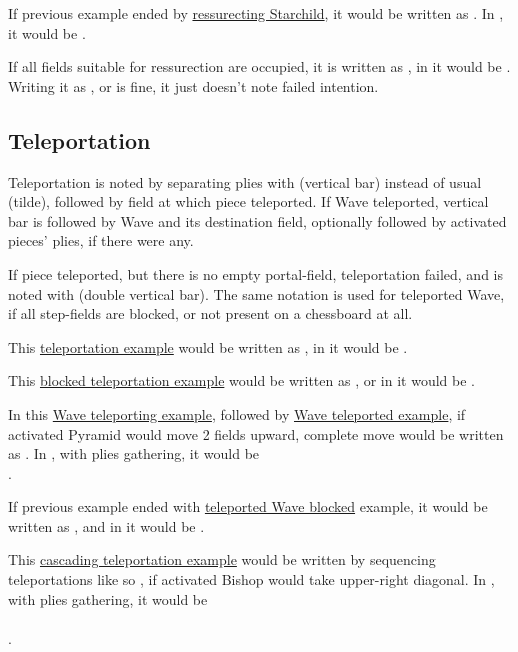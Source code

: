 If previous example ended by \hyperref[fig:scn_o_25_syzygy_starchild_ressurection]{ressurecting Starchild},
it would be written as . In , it would be .

If all fields suitable for ressurection are occupied, it is written as , in  it
would be . Writing it as , or  is fine, it just doesn't note failed
intention.

\subsection*{Teleportation}
\label{sec:Appendix/Teleportation}

Teleportation is noted by separating plies with \alg{|} (vertical bar) instead of usual \alg{\~{}} (tilde),
followed by field at which piece teleported. If Wave teleported, vertical bar is followed by Wave and its
destination field, optionally followed by activated pieces' plies, if there were any.

If piece teleported, but there is no empty portal-field, teleportation failed, and is noted with \alg{||}
(double vertical bar). The same notation is used for teleported Wave, if all step-fields are blocked, or
not present on a chessboard at all.

This \hyperref[fig:scn_n_02_teleport_init]{teleportation example} would be written as , in
 it would be .

This \hyperref[fig:scn_n_03_teleport_move_2]{blocked teleportation example} would be written as ,
or in  it would be .

In this \hyperref[fig:scn_n_04_teleport_move_3]{Wave teleporting example}, followed by
\hyperref[fig:scn_n_05_teleport_end]{Wave teleported example}, if activated Pyramid would move 2 fields upward,
complete move would be written as . In , with plies gathering, it would
be \\
\alg{[Gi11-g15]\~{}[Wg15-a18]|[Wr1-l4]\~{}[Al4-l6]}.

If previous example ended with \hyperref[fig:scn_n_06_teleport_wave_blocked]{teleported Wave blocked} example,
it would be written as , and in  it would be \alg{[Gi11-g15]\~{}[Wg15-a18]||}.

This \hyperref[fig:scn_d_13_teleporting_wave_cascade]{cascading teleportation example} would be written by
sequencing teleportations like so , if activated Bishop would take upper-right
diagonal. In , with plies gathering, it would be \\
\alg{[Gj6-h2]\~{}[Wh2-b4]|[Wm18-a24]|[Wx1-r4]\~{}}\\
\alg{[Br4-t6]}.

